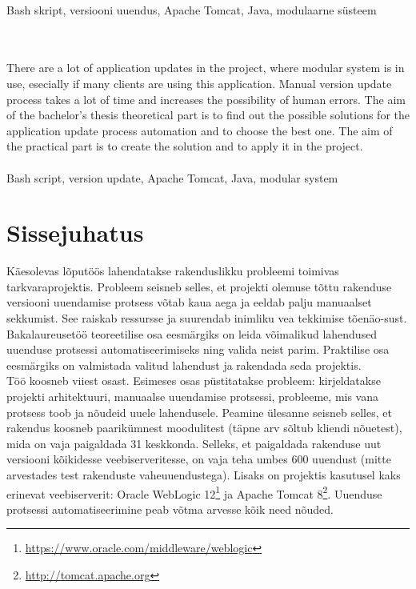 \documentclass[12pt]{report}
\renewcommand{\headrulewidth}{0pt}
\begin{document}
  \\
  Bash skript, versiooni uuendus, Apache Tomcat, Java, modulaarne süsteem
  \vspace{2cm}

  \\

  \\
  There are a lot of application updates in the project, where modular system is in use, esecially if many clients are using this application. Manual version update process takes a lot of time and increases the possibility of human errors. The aim of the bachelor’s thesis theoretical part is to find out the possible solutions for the application update process automation and to choose the best one. The aim of the practical part is to create the solution and to apply it in the project.\\

  \\
  Bash script, version update, Apache Tomcat, Java, modular system
  
  \newpage
 
  \tableofcontents
  \fancypagestyle{plain}{%
    \renewcommand{\headrulewidth}{0pt}%
    \fancyhf{}%
    \fancyfoot[R]{\thepage}%
  }
 
  \newpage
  
  \section*{Sissejuhatus}
  \label{sissejuhatus}
  
  Käesolevas lõputöös lahendatakse rakenduslikku probleemi toimivas tarkvaraprojektis. Probleem seisneb selles, et projekti olemuse tõttu rakenduse versiooni uuendamise protsess võtab kaua aega ja eeldab palju manuaalset sekkumist. See raiskab ressursse ja suurendab inimliku vea tekkimise tõenäo-sust. Bakalaureusetöö teoreetilise osa eesmärgiks on leida võimalikud lahendused uuenduse protsessi automatiseerimiseks ning valida neist parim. Praktilise osa eesmärgiks on valmistada valitud lahendust ja rakendada seda projektis.\\
  
  Töö koosneb viiest osast. Esimeses osas püstitatakse probleem: kirjeldatakse projekti arhitektuuri, manuaalse uuendamise protsessi, probleeme, mis vana protsess toob ja nõudeid uuele lahendusele. Peamine ülesanne seisneb selles, et rakendus koosneb paarikümnest moodulitest (täpne arv sõltub kliendi nõuetest), mida on vaja paigaldada 31 keskkonda. Selleks, et paigaldada rakenduse uut versiooni kõikidesse veebiserveritesse, on vaja teha umbes 600 uuendust (mitte arvestades test rakenduste vaheuuendustega). Lisaks on projektis kasutusel kaks erinevat veebiserverit: Oracle WebLogic 12\footnote{\url{https://www.oracle.com/middleware/weblogic}} ja Apache Tomcat 8\footnote{\url{http://tomcat.apache.org}}. Uuenduse protsessi automatiseerimine peab võtma arvesse kõik need nõuded.\\
  
\end{document}
